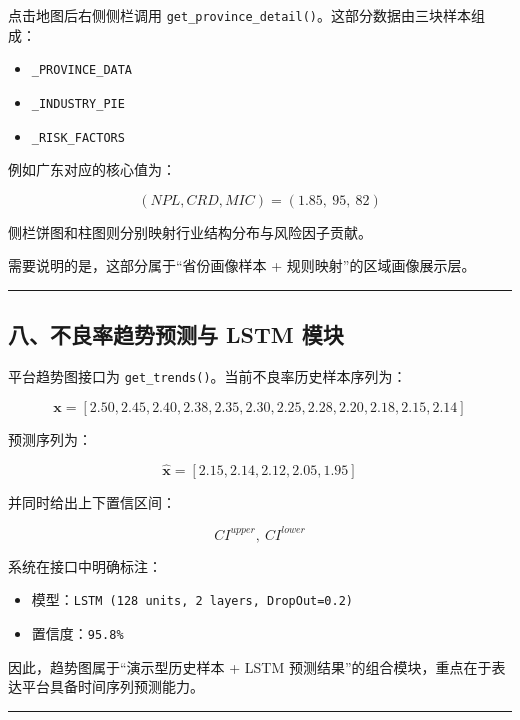 \documentclass[
]{article}
\providecommand{\tightlist}{%
  \setlength{\itemsep}{0pt}\setlength{\parskip}{0pt}}
\begin{document}
点击地图后右侧侧栏调用
\texttt{get\_province\_detail()}。这部分数据由三块样本组成：

\begin{itemize}
\tightlist
\item
  \texttt{\_PROVINCE\_DATA}
\item
  \texttt{\_INDUSTRY\_PIE}
\item
  \texttt{\_RISK\_FACTORS}
\end{itemize}

例如广东对应的核心值为：

\[
(NPL, CRD, MIC) = (1.85,\ 95,\ 82)
\]

侧栏饼图和柱图则分别映射行业结构分布与风险因子贡献。

需要说明的是，这部分属于``省份画像样本 + 规则映射''的区域画像展示层。

\begin{center}\rule{0.5\linewidth}{0.5pt}\end{center}

\subsection{八、不良率趋势预测与 LSTM
模块}\label{ux516bux4e0dux826fux7387ux8d8bux52bfux9884ux6d4bux4e0e-lstm-ux6a21ux5757}

平台趋势图接口为 \texttt{get\_trends()}。当前不良率历史样本序列为：

\[
\mathbf{x} = [2.50, 2.45, 2.40, 2.38, 2.35, 2.30, 2.25, 2.28, 2.20, 2.18, 2.15, 2.14]
\]

预测序列为：

\[
\hat{\mathbf{x}} = [2.15, 2.14, 2.12, 2.05, 1.95]
\]

并同时给出上下置信区间：

\[
CI^{upper},\ CI^{lower}
\]

系统在接口中明确标注：

\begin{itemize}
\tightlist
\item
  模型：\texttt{LSTM\ (128\ units,\ 2\ layers,\ DropOut=0.2)}
\item
  置信度：\texttt{95.8\%}
\end{itemize}

因此，趋势图属于``演示型历史样本 + LSTM
预测结果''的组合模块，重点在于表达平台具备时间序列预测能力。

\begin{center}\rule{0.5\linewidth}{0.5pt}\end{center}
\end{document}
